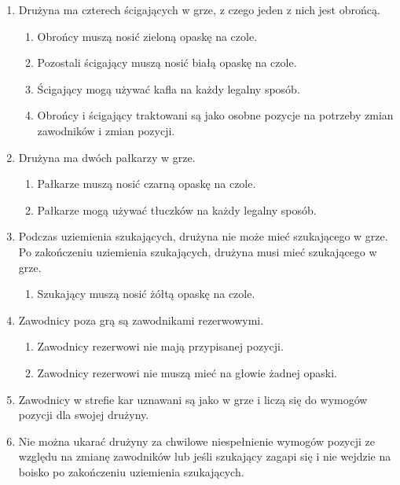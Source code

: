 \documentclass[11pt,a4paper]{article}
\begin{document}
\begin{enumerate}

\item
  Drużyna ma czterech ścigających w grze, z czego jeden z nich jest
  obrońcą.

  \begin{enumerate}
  
  \item
    Obrońcy muszą nosić zieloną opaskę na czole.
  \item
    Pozostali ścigający muszą nosić białą opaskę na czole.
  \item
    Ścigający mogą używać kafla na każdy legalny sposób.
  \item
    Obrońcy i ścigający traktowani są jako osobne pozycje na potrzeby
    zmian zawodników i zmian pozycji.
  \end{enumerate}
\item
  Drużyna ma dwóch pałkarzy w grze.

  \begin{enumerate}
  
  \item
    Pałkarze muszą nosić czarną opaskę na czole.
  \item
    Pałkarze mogą używać tłuczków na każdy legalny sposób.
  \end{enumerate}
\item
  Podczas uziemienia szukających, drużyna nie może mieć szukającego w
  grze. Po zakończeniu uziemienia szukających, drużyna musi mieć
  szukającego w grze.

  \begin{enumerate}
  
  \item
    Szukający muszą nosić żółtą opaskę na czole.
  \end{enumerate}
\item
  Zawodnicy poza grą są zawodnikami rezerwowymi.

  \begin{enumerate}
  
  \item
    Zawodnicy rezerwowi nie mają przypisanej pozycji.
  \item
    Zawodnicy rezerwowi nie muszą mieć na głowie żadnej opaski.
  \end{enumerate}
\item
  Zawodnicy w strefie kar uznawani są jako w grze i liczą się do wymogów
  pozycji dla swojej drużyny.
\item
  Nie można ukarać drużyny za chwilowe niespełnienie wymogów pozycji ze
  względu na zmianę zawodników lub jeśli szukający zagapi się i nie
  wejdzie na boisko po zakończeniu uziemienia szukających.
\end{enumerate}
\end{document}
